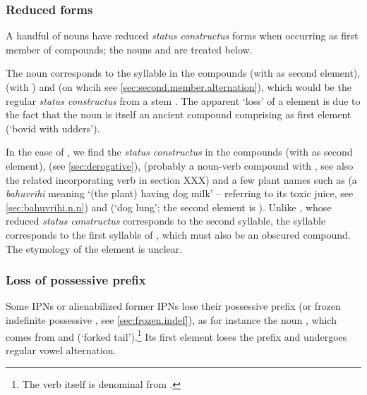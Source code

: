 \subsubsection{Reduced forms} \label{sec:reduced.forms.compounds}   
A handful of nouns have reduced \textit{status constructus} forms when occurring as first member of compounds; the nouns  and  are treated below. 

The noun  corresponds to the syllable  in the compounds  (with  as second element),  (with ) and  (on whcih see \ref{sec:second.member.alternation}), which would be the regular \textit{status constructus} from a stem . The apparent `loss' of a  element is due to the fact that the noun  is itself an ancient compound comprising  as first element (`bovid with udders').

In the case of , we find the \textit{status constructus}  in the compounds  (with  as second element),  (see \ref{sec:derogative}),  (probably a noun-verb compound with , see also the related incorporating verb in section XXX) and a few plant names such as  (a \textit{bahuvrīhi} meaning `(the plant) having dog milk' -- referring to its toxic juice, see \ref{sec:bahuvrihi.n.n}) and  (`dog lung'; the second element is ). Unlike  , whose reduced \textit{status constructus} corresponds to the second syllable, the syllable  corresponds to the first syllable of , which must also be an obscured compound. The etymology of  the element  is unclear.

\subsubsection{Loss of possessive prefix} \label{sec:loss.possessive.prefix.compounds}
Some IPNs or alienabilized former IPNs lose their possessive prefix (or frozen indefinite possessive , see \ref{sec:frozen.indef}), as for instance the noun  , which comes from  and  (`forked tail').\footnote{The verb  itself is denominal from .} Its first element  loses the prefix  and undergoes regular vowel alternation.

